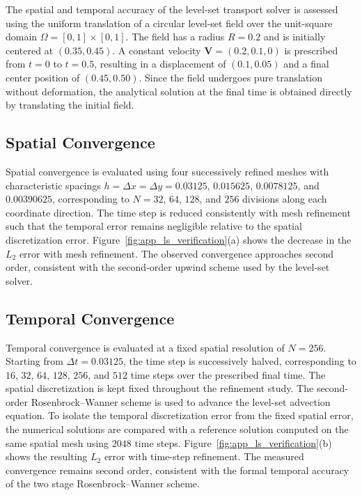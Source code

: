 The spatial and temporal accuracy of the level-set transport solver is assessed using the uniform translation of a circular level-set field over the unit-square domain $\Omega=[0,1]\times[0,1]$. The field has a radius $R=0.2$ and is initially centered at $(0.35,0.45)$. A constant velocity $\boldsymbol{V}=(0.2,0.1,0)$ is prescribed from $t=0$ to $t=0.5$, resulting in a displacement of $(0.1,0.05)$ and a final center position of $(0.45,0.50)$. Since the field undergoes pure translation without deformation, the analytical solution at the final time is obtained directly by translating the initial field.


\subsection{Spatial Convergence}

Spatial convergence is evaluated using four successively refined meshes with characteristic spacings $h=\Delta x=\Delta y=0.03125$, $0.015625$, $0.0078125$, and $0.00390625$, corresponding to $N=32$, $64$, $128$, and $256$ divisions along each coordinate direction. The time step is reduced consistently with mesh refinement such that the temporal error remains negligible relative to the spatial discretization error. Figure~\ref{fig:app_ls_verification}(a) shows the decrease in the $L_2$ error with mesh refinement. The observed convergence approaches second order, consistent with the second-order upwind scheme used by the level-set solver.

\subsection{Temporal Convergence}

Temporal convergence is evaluated at a fixed spatial resolution of $N=256$. Starting from $\Delta t=0.03125$, the time step is successively halved, corresponding to $16$, $32$, $64$, $128$, $256$, and $512$ time steps over the prescribed final time. The spatial discretization is kept fixed throughout the refinement study. The second-order Rosenbrock--Wanner scheme is used to advance the level-set advection equation. To isolate the temporal discretization error from the fixed spatial error, the numerical solutions are compared with a reference solution computed on the same spatial mesh using $2048$ time steps. Figure~\ref{fig:app_ls_verification}(b) shows the resulting $L_2$ error with time-step refinement. The measured convergence remains second order, consistent with the formal temporal accuracy of the two stage Rosenbrock--Wanner scheme.

